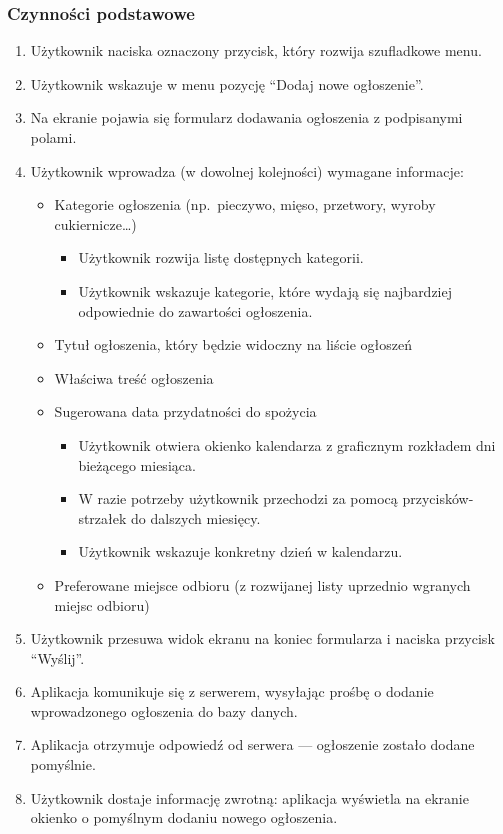 \documentclass[licencjacka]{pracamgr}
\begin{document}
    \subsubsection{Czynności podstawowe}
    \begin{enumerate}
        \item Użytkownik naciska oznaczony przycisk, który rozwija szufladkowe menu.
        \item Użytkownik wskazuje w menu pozycję ``Dodaj nowe ogłoszenie''.
        \item Na ekranie pojawia się formularz dodawania ogłoszenia z podpisanymi polami.
        \item Użytkownik wprowadza (w dowolnej kolejności) wymagane informacje:
        \begin{itemize}
            \item Kategorie ogłoszenia (np.\ pieczywo, mięso, przetwory, wyroby cukiernicze\ldots)
            \begin{itemize}
                \item Użytkownik rozwija listę dostępnych kategorii.
                \item Użytkownik wskazuje kategorie, które wydają się najbardziej odpowiednie do zawartości ogłoszenia.
            \end{itemize}
            \item Tytuł ogłoszenia, który będzie widoczny na liście ogłoszeń
            \item Właściwa treść ogłoszenia
            \item Sugerowana data przydatności do spożycia
            \begin{itemize}
                \item Użytkownik otwiera okienko kalendarza z graficznym rozkładem dni bieżącego miesiąca.
                \item W razie potrzeby użytkownik przechodzi za pomocą przycisków-strzałek do dalszych miesięcy.
                \item Użytkownik wskazuje konkretny dzień w kalendarzu.
            \end{itemize}
            \item Preferowane miejsce odbioru (z rozwijanej listy uprzednio wgranych miejsc odbioru)
        \end{itemize}
        \item Użytkownik przesuwa widok ekranu na koniec formularza i naciska przycisk ``Wyślij''.
        \item Aplikacja komunikuje się z serwerem, wysyłając prośbę o dodanie wprowadzonego ogłoszenia do bazy danych.
        \item Aplikacja otrzymuje odpowiedź od serwera --- ogłoszenie zostało dodane pomyślnie.
        \item Użytkownik dostaje informację zwrotną: aplikacja wyświetla na ekranie okienko o pomyślnym dodaniu nowego ogłoszenia.
    \end{enumerate}
\end{document}
